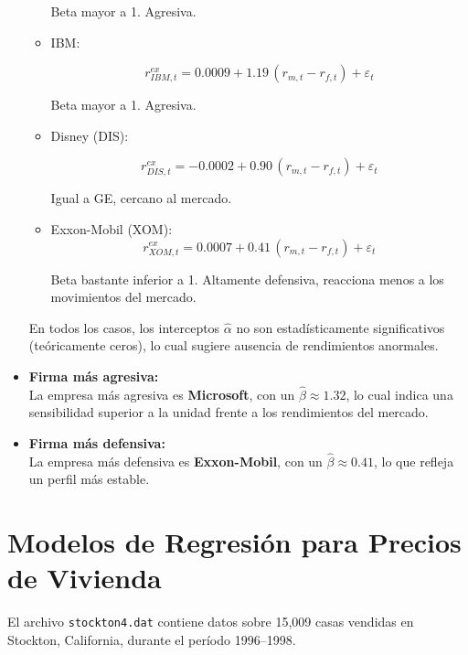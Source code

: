 \documentclass[12pt]{article}
\begin{document}
\begin{itemize}
\begin{itemize}
    Beta mayor a 1. Agresiva.
    \item IBM: 
    
    \[
      r_{IBM,t}^{ex} = 0.0009 + 1.19 \,(r_{m,t} - r_{f,t}) + \varepsilon_t
    \] 
    
    Beta mayor a 1. Agresiva.
    \item Disney (DIS): 
    
    \[
      r_{DIS,t}^{ex} = -0.0002 + 0.90 \,(r_{m,t} - r_{f,t}) + \varepsilon_t
    \]
    
    Igual a GE, cercano al mercado.
    
    \item Exxon-Mobil (XOM): \[
      r_{XOM,t}^{ex} = 0.0007 + 0.41 \,(r_{m,t} - r_{f,t}) + \varepsilon_t
    \]
    
    Beta bastante inferior a 1. Altamente defensiva, reacciona menos a los movimientos del mercado.
  \end{itemize}
  
  En todos los casos, los interceptos $\hat\alpha$ no son estadísticamente significativos (teóricamente ceros), lo cual sugiere ausencia de rendimientos anormales.

  \item \textbf{Firma más agresiva:} \\
  La empresa más agresiva es \textbf{Microsoft}, con un $\hat\beta \approx 1.32$, lo cual indica una sensibilidad superior a la unidad frente a los rendimientos del mercado.

  \item \textbf{Firma más defensiva:} \\
  La empresa más defensiva es \textbf{Exxon-Mobil}, con un $\hat\beta \approx 0.41$, lo que refleja un perfil más estable.
\end{itemize}


\section{Modelos de Regresión para Precios de Vivienda}

El archivo \texttt{stockton4.dat} contiene datos sobre 15,009 casas vendidas en Stockton, California, durante el período 1996--1998. 
\end{document}
